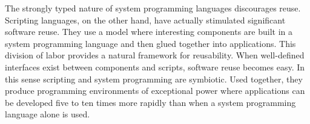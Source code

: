 \documentclass[10pt]{article}
\begin{document}


The strongly typed nature of system programming languages discourages
reuse. Scripting languages, on the other hand, have actually
stimulated significant software reuse. They use a model where
interesting components are built in a system programming language and
then glued together into applications.
This division of labor provides a natural framework for reusability.
When well-defined interfaces exist between components and scripts, software reuse becomes easy.
In this sense scripting and system programming are symbiotic. Used
together, they produce programming environments of exceptional power where applications can be developed
five to ten times more rapidly than when a system programming language alone is used.

\end{document}
